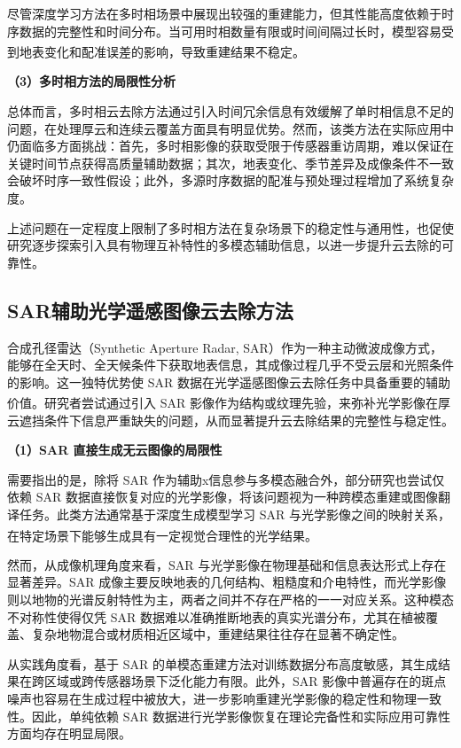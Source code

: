 尽管深度学习方法在多时相场景中展现出较强的重建能力，但其性能高度依赖于时序数据的完整性和时间分布。当可用时相数量有限或时间间隔过长时，模型容易受到地表变化和配准误差的影响\textsuperscript{\cite{ji2020simultaneous}}，导致重建结果不稳定。

\textbf{（3）多时相方法的局限性分析}

总体而言，多时相云去除方法通过引入时间冗余信息有效缓解了单时相信息不足的问题，在处理厚云和连续云覆盖方面具有明显优势。然而，该类方法在实际应用中仍面临多方面挑战：首先，多时相影像的获取受限于传感器重访周期，难以保证在关键时间节点获得高质量辅助数据；其次，地表变化、季节差异及成像条件不一致会破坏时序一致性假设；此外，多源时序数据的配准与预处理过程增加了系统复杂度。

上述问题在一定程度上限制了多时相方法在复杂场景下的稳定性与通用性，也促使研究逐步探索引入具有物理互补特性的多模态辅助信息，以进一步提升云去除的可靠性。

\subsection{SAR辅助光学遥感图像云去除方法}

合成孔径雷达（Synthetic Aperture Radar, SAR）作为一种主动微波成像方式，能够在全天时、全天候条件下获取地表信息，其成像过程几乎不受云层和光照条件的影响。这一独特优势使 SAR 数据在光学遥感图像云去除任务中具备重要的辅助价值\textsuperscript{\cite{gao2019cloud,chen2022cloud}}。研究者尝试通过引入 SAR 影像作为结构或纹理先验，来弥补光学影像在厚云遮挡条件下信息严重缺失的问题，从而显著提升云去除结果的完整性与稳定性。

\textbf{（1）SAR 直接生成无云图像的局限性}

需要指出的是，除将 SAR 作为辅助x信息参与多模态融合外，部分研究也尝试仅依赖 SAR 数据直接恢复对应的光学影像，将该问题视为一种跨模态重建或图像翻译任务。此类方法通常基于深度生成模型学习 SAR 与光学影像之间的映射关系，在特定场景下能够生成具有一定视觉合理性的光学结果\textsuperscript{\cite{darbaghshahi2021cloud}}。

然而，从成像机理角度来看，SAR 与光学影像在物理基础和信息表达形式上存在显著差异。SAR 成像主要反映地表的几何结构、粗糙度和介电特性，而光学影像则以地物的光谱反射特性为主，两者之间并不存在严格的一一对应关系。这种模态不对称性使得仅凭 SAR 数据难以准确推断地表的真实光谱分布，尤其在植被覆盖、复杂地物混合或材质相近区域中，重建结果往往存在显著不确定性。

从实践角度看，基于 SAR 的单模态重建方法对训练数据分布高度敏感，其生成结果在跨区域或跨传感器场景下泛化能力有限。此外，SAR 影像中普遍存在的斑点噪声也容易在生成过程中被放大，进一步影响重建光学影像的稳定性和物理一致性。因此，单纯依赖 SAR 数据进行光学影像恢复在理论完备性和实际应用可靠性方面均存在明显局限。

